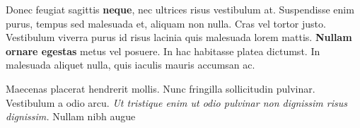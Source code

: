 Donec feugiat sagittis \textbf{neque}, nec ultrices risus vestibulum at. 
Suspendisse enim purus, tempus sed malesuada et, aliquam non nulla. Cras vel 
tortor justo. Vestibulum viverra purus id risus lacinia quis malesuada lorem 
mattis. \textbf{Nullam ornare egestas} metus vel posuere. In hac habitasse platea 
dictumst. In malesuada aliquet nulla, quis iaculis mauris accumsan ac.

Maecenas placerat hendrerit mollis. Nunc fringilla sollicitudin pulvinar. 
Vestibulum a odio arcu. \textit{Ut tristique enim ut odio pulvinar non dignissim 
risus dignissim.} Nullam nibh augue
